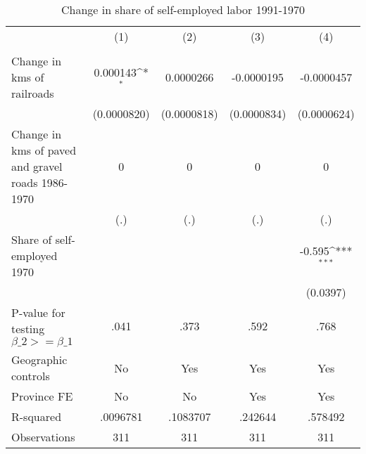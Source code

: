 \begin{table}[htbp]\centering
\def\sym#1{\ifmmode^{#1}\else\(^{#1}\)\fi}
\caption{Change in share of self-employed labor 1991-1970}
\begin{tabular}{l*{4}{c}}
\hline\hline
                &\multicolumn{1}{c}{(1)}&\multicolumn{1}{c}{(2)}&\multicolumn{1}{c}{(3)}&\multicolumn{1}{c}{(4)}\\
                &\multicolumn{1}{c}{}&\multicolumn{1}{c}{}&\multicolumn{1}{c}{}&\multicolumn{1}{c}{}\\
\hline
Change in kms of railroads& 0.000143\sym{*}  &0.0000266         &-0.0000195         &-0.0000457         \\
                &(0.0000820)         &(0.0000818)         &(0.0000834)         &(0.0000624)         \\
[1em]
Change in kms of paved and gravel roads 1986-1970&        0         &        0         &        0         &        0         \\
                &      (.)         &      (.)         &      (.)         &      (.)         \\
[1em]
Share of self-employed 1970&                  &                  &                  &   -0.595\sym{***}\\
                &                  &                  &                  & (0.0397)         \\
\hline
P-value for testing $\beta\_{2} >= \beta\_{1}$&     .041         &     .373         &     .592         &     .768         \\
Geographic controls&       No         &      Yes         &      Yes         &      Yes         \\
Province FE     &       No         &       No         &      Yes         &      Yes         \\
R-squared       & .0096781         & .1083707         &  .242644         &  .578492         \\
Observations    &      311         &      311         &      311         &      311         \\
\hline\hline
\end{tabular}
\end{table}
